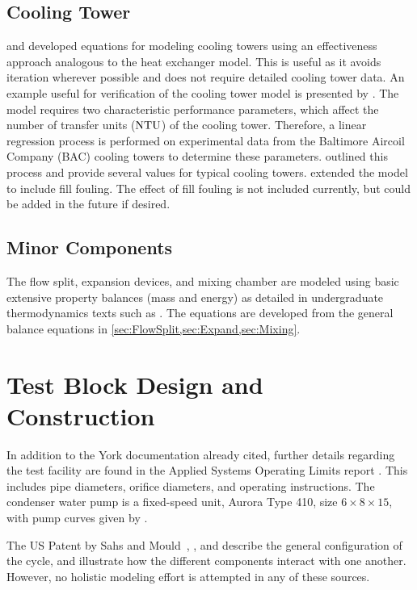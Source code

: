 \subsection{Cooling Tower}
\textcite{braun1989} and \textcite{mitchell2013} developed equations for modeling cooling towers 
using an effectiveness approach analogous to the heat exchanger model.
This is useful as it avoids iteration wherever possible
and does not require detailed cooling tower data. 
An example useful for verification of the cooling tower model 
is presented by \textcite{mitchell2013}. 
The model requires two characteristic performance parameters, 
which affect the number of transfer units ($\mathrm{NTU}$) of the cooling tower.
Therefore, a linear regression process is performed on experimental data from 
the Baltimore Aircoil Company 
(BAC) cooling towers \parencite{CLTselect} 
to determine these parameters.
\textcite{braun1989} outlined this process and provide several values 
for typical cooling towers. 
\textcite{qureshi2006} extended the model to include fill fouling.
The effect of fill fouling is not included currently, but could be added 
in the future if desired.

\subsection{Minor Components}
The flow split, expansion devices, and mixing chamber are modeled using 
basic extensive property balances (mass and energy) as detailed in 
undergraduate thermodynamics texts such as \textcite{cengel2011}. 
The equations are developed from the general balance equations 
in \cref{sec:FlowSplit,sec:Expand,sec:Mixing}.

\section{Test Block Design and Construction}
In addition to the York documentation already cited, further details
regarding the test facility are found in the Applied Systems Operating Limits
report \parencite{bluebook}. This includes pipe diameters, orifice diameters, and
operating instructions. The condenser water pump is a fixed-speed unit,
Aurora Type 410, size $6\times8\times15$, with pump curves given by
\textcite{aurora2007}.

The US Patent by Sahs and Mould~\parencite{sahs1956}, \textcite{dirlea1996},
and \textcite{mcgovern1984} describe the general configuration
of the cycle, and illustrate how the different components interact with one 
another.
However, no holistic modeling effort is attempted in any of these sources.

